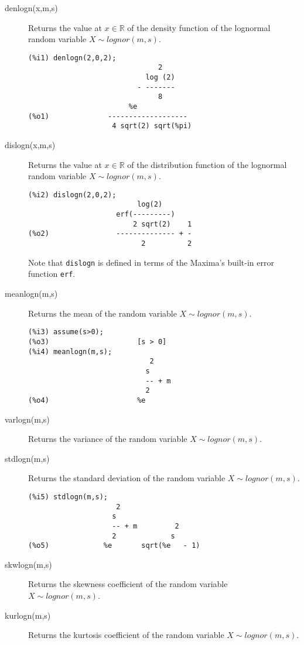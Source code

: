 \documentclass[12pt,a4paper]{article}
\newcommand{\R}{\mathbb{R}}
\begin{document}
\begin{description}

\item[denlogn(x,m,s)] Returns the value at $x \in \R$ of the density function of the lognormal random variable $X \sim lognor(m,s)$.

\begin{verbatim}
(%i1) denlogn(2,0,2);
                               2
                            log (2)
                          - -------
                               8
                        %e
(%o1)              -------------------
                    4 sqrt(2) sqrt(%pi)
\end{verbatim}

\item[dislogn(x,m,s)] Returns the value at $x \in \R$ of the distribution function of the lognormal random variable $X \sim lognor(m,s)$.

\begin{verbatim}
(%i2) dislogn(2,0,2);
                          log(2)
                     erf(---------)
                         2 sqrt(2)    1
(%o2)                -------------- + -
                           2          2
\end{verbatim}
Note that \verb|dislogn| is defined in terms of the Maxima's built-in error function \verb|erf|.

\item[meanlogn(m,s)] Returns the mean of the random variable  $X \sim lognor(m,s)$.

\begin{verbatim}
(%i3) assume(s>0);
(%o3)                     [s > 0]
(%i4) meanlogn(m,s);
                             2
                            s
                            -- + m
                            2
(%o4)                     %e
\end{verbatim}

\item[varlogn(m,s)] Returns the variance of the random variable  $X \sim lognor(m,s)$.

\item[stdlogn(m,s)] Returns the standard deviation of the random variable  $X \sim lognor(m,s)$.

\begin{verbatim}
(%i5) stdlogn(m,s);
                     2
                    s
                    -- + m         2
                    2             s
(%o5)             %e       sqrt(%e   - 1)
\end{verbatim}

\item[skwlogn(m,s)] Returns the skewness coefficient of the random variable  $X \sim lognor(m,s)$.

\item[kurlogn(m,s)] Returns the kurtosis coefficient of the random variable  $X \sim lognor(m,s)$.

\end{description}
\end{document}
